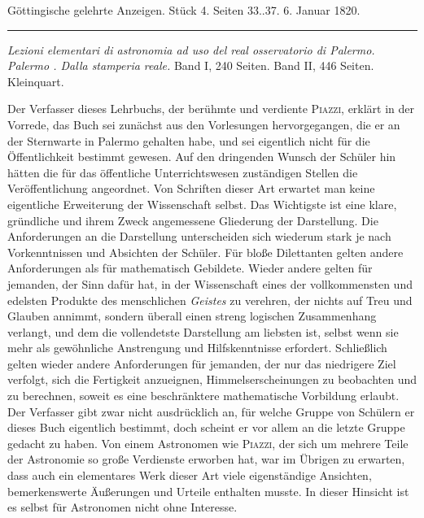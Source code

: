 \clearpage
{}
\hypertarget{native-622-lower}{}
\begin{center}\small Göttingische gelehrte Anzeigen. Stück 4. Seiten 33..37. 6. Januar 1820.\\[3pt]\rule{.72\linewidth}{.3pt}\end{center}

\noindent\emph{Lezioni elementari di astronomia ad uso del real osservatorio di Palermo. Palermo {}. Dalla stamperia reale.} Band I, 240 Seiten. Band II, 446 Seiten. Kleinquart.

\begingroup{}\relax
Der Verfasser dieses Lehrbuchs, der berühmte und verdiente \textsc{Piazzi}, erklärt in der Vorrede, das Buch sei zunächst aus den Vorlesungen hervorgegangen, die er an der Sternwarte in Palermo gehalten habe, und sei eigentlich nicht für die Öffentlichkeit bestimmt gewesen. Auf den dringenden Wunsch der Schüler hin hätten die für das öffentliche Unterrichtswesen zuständigen Stellen die Veröffentlichung angeordnet. Von Schriften dieser Art erwartet man keine eigentliche Erweiterung der Wissenschaft selbst. Das Wichtigste ist eine klare, gründliche und ihrem Zweck angemessene Gliederung der Darstellung. Die Anforderungen an die Darstellung unterscheiden sich wiederum stark je nach Vorkenntnissen und Absichten der Schüler. Für bloße Dilettanten gelten andere Anforderungen als für mathematisch Gebildete. Wieder andere gelten für jemanden, der Sinn dafür hat, in der Wissenschaft eines der vollkommensten und edelsten Produkte des menschlichen \emph{Geistes} zu verehren, der nichts auf Treu und Glauben annimmt, sondern überall einen streng logischen Zusammenhang verlangt, und dem die vollendetste Darstellung am liebsten ist, selbst wenn sie mehr als gewöhnliche Anstrengung und Hilfskenntnisse erfordert. Schließlich gelten wieder andere Anforderungen für jemanden, der nur das niedrigere Ziel verfolgt, sich die Fertigkeit anzueignen, Himmelserscheinungen zu beobachten und zu berechnen, soweit es eine beschränktere mathematische Vorbildung erlaubt. Der Verfasser gibt zwar nicht ausdrücklich an, für welche Gruppe von Schülern er dieses Buch eigentlich bestimmt, doch scheint er vor allem an die letzte Gruppe gedacht zu haben. Von einem Astronomen wie \textsc{Piazzi}, der sich um mehrere Teile der Astronomie so große Verdienste erworben hat, war im Übrigen zu erwarten, dass auch ein elementares Werk dieser Art viele eigenständige Ansichten, bemerkenswerte Äußerungen und Urteile enthalten musste. In dieser Hinsicht ist es selbst für Astronomen nicht ohne Interesse.

